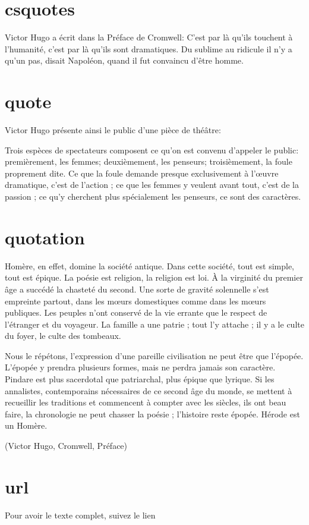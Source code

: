 \documentclass{article}
\begin{document}
\section{csquotes}

Victor Hugo a écrit dans la Préface de Cromwell: C’est par là qu’ils  touchent à l’humanité, c’est par là qu’ils sont dramatiques. Du sublime au ridicule il n’y a qu’un pas, disait Napoléon, quand il fut convaincu d’être homme.

\section{quote}


Victor Hugo présente ainsi le public d'une pièce de théâtre:

Trois espèces de spectateurs composent ce qu’on est convenu d’appeler le public: premièrement, les femmes; deuxièmement, les penseurs; troisièmement, la foule proprement dite. Ce que la foule demande presque exclusivement à l’œuvre dramatique, c’est de l’action ; ce que les femmes y veulent avant tout, c’est de la passion ; ce qu’y cherchent plus spécialement les penseurs, ce sont des caractères.


\section{quotation}

Homère, en effet, domine la société antique. Dans cette société, tout est simple, tout est épique. La poésie est religion, la religion est loi. À la virginité du premier âge a succédé la chasteté du second. Une sorte de gravité solennelle s’est empreinte partout, dans les mœurs domestiques comme dans les mœurs publiques. Les peuples n’ont conservé de la vie errante que le respect de l’étranger et du voyageur. La famille a une patrie ; tout l’y attache ; il y a le culte du foyer, le culte des tombeaux.

Nous le répétons, l’expression d’une pareille civilisation ne peut être que l’épopée. L’épopée y prendra plusieurs formes, mais ne perdra jamais son caractère. Pindare est plus sacerdotal que patriarchal, plus épique que lyrique. Si les annalistes, contemporains nécessaires de ce second âge du monde, se mettent à recueillir les traditions et commencent à compter avec les siècles, ils ont beau faire, la chronologie ne peut chasser la poésie ; l’histoire reste épopée. Hérode est un Homère.

(Victor Hugo, Cromwell, Préface)

\section{url}
Pour avoir le texte complet, suivez le lien %
\end{document}
